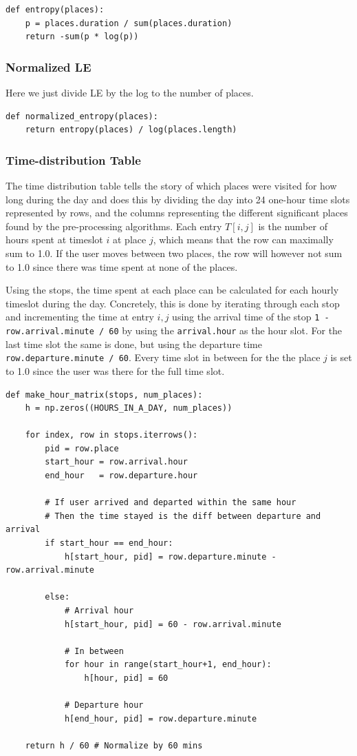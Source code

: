 \begin{verbatim}
def entropy(places):
    p = places.duration / sum(places.duration)
    return -sum(p * log(p))
\end{verbatim}

\subsubsection{Normalized LE} 
Here we just divide LE by the log to the number of places.

\begin{verbatim}
def normalized_entropy(places):
    return entropy(places) / log(places.length)
\end{verbatim}

\subsubsection{Time-distribution Table}
The time distribution table tells the story of which places were visited for how long during the day and does this by dividing the day into 24 one-hour time slots represented by rows, and the columns representing the different significant places found by the pre-processing algorithms. Each entry $T[i,j]$ is the number of hours spent at timeslot $i$ at place $j$, which means that the row can maximally sum to 1.0. If the user moves between two places, the row will however not sum to 1.0 since there was time spent at none of the places.

Using the stops, the time spent at each place can be calculated for each hourly timeslot during the day. Concretely, this is done by iterating through each stop and incrementing the time at entry $i,j$ using the arrival time of the stop \verb|1 - row.arrival.minute / 60| by using the \verb|arrival.hour| as the hour slot. For the last time slot the same is done, but using the departure time \verb|row.departure.minute / 60|. Every time slot in between for the the place $j$ is set to 1.0 since the user was there for the full time slot.

\begin{verbatim}
def make_hour_matrix(stops, num_places):
    h = np.zeros((HOURS_IN_A_DAY, num_places))
    
    for index, row in stops.iterrows():
        pid = row.place
        start_hour = row.arrival.hour
        end_hour   = row.departure.hour
        
        # If user arrived and departed within the same hour
        # Then the time stayed is the diff between departure and arrival
        if start_hour == end_hour:
            h[start_hour, pid] = row.departure.minute - row.arrival.minute
        
        else:
            # Arrival hour
            h[start_hour, pid] = 60 - row.arrival.minute

            # In between
            for hour in range(start_hour+1, end_hour):
                h[hour, pid] = 60

            # Departure hour
            h[end_hour, pid] = row.departure.minute
        
    return h / 60 # Normalize by 60 mins
\end{verbatim}

